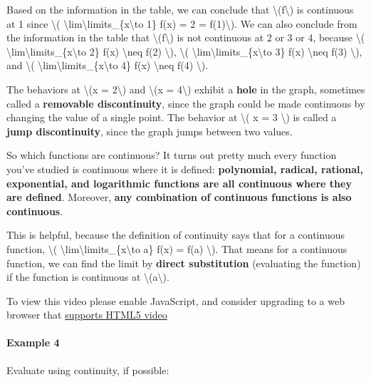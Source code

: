 Based on the information in the table, we can conclude that
\textbackslash{}(f\textbackslash{}) is continuous at 1 since
\textbackslash{}(
\textbackslash{}lim\textbackslash{}limits\_\{x\textbackslash{}to 1\}
f(x) = 2 = f(1)\textbackslash{}). We can also conclude from the
information in the table that \textbackslash{}(f\textbackslash{}) is not
continuous at 2 or 3 or 4, because \textbackslash{}(
\textbackslash{}lim\textbackslash{}limits\_\{x\textbackslash{}to 2\}
f(x) \textbackslash{}neq f(2) \textbackslash{}), \textbackslash{}(
\textbackslash{}lim\textbackslash{}limits\_\{x\textbackslash{}to 3\}
f(x) \textbackslash{}neq f(3) \textbackslash{}), and \textbackslash{}(
\textbackslash{}lim\textbackslash{}limits\_\{x\textbackslash{}to 4\}
f(x) \textbackslash{}neq f(4) \textbackslash{}).

The behaviors at \textbackslash{}(x = 2\textbackslash{}) and
\textbackslash{}(x = 4\textbackslash{}) exhibit a \textbf{hole} in the
graph, sometimes called a \textbf{removable discontinuity}, since the
graph could be made continuous by changing the value of a single point.
The behavior at \textbackslash{}( x = 3 \textbackslash{}) is called a
\textbf{jump discontinuity}, since the graph jumps between two values.

So which functions are continuous? It turns out pretty much every
function you've studied is continuous where it is defined:
\textbf{polynomial, radical, rational, exponential, and logarithmic
functions are all continuous where they are defined}. Moreover,
\textbf{any combination of continuous functions is also continuous}.

This is helpful, because the definition of continuity says that for a
continuous function, \textbackslash{}(
\textbackslash{}lim\textbackslash{}limits\_\{x\textbackslash{}to a\}
f(x) = f(a) \textbackslash{}). That means for a continuous function, we
can find the limit by \textbf{direct substitution} (evaluating the
function) if the function is continuous at
\textbackslash{}(a\textbackslash{}).

To view this video please enable JavaScript, and consider upgrading to a
web browser that \href{http://videojs.com/html5-video-support/}{supports
HTML5 video}

\hypertarget{example-4}{%
\paragraph{Example 4}\label{example-4}}

Evaluate using continuity, if possible:

